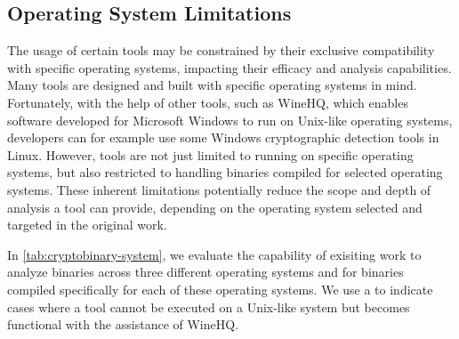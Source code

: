 

\subsection{Operating System Limitations}

The usage of certain tools may be constrained by their exclusive compatibility with specific operating systems, impacting their efficacy and analysis capabilities. Many tools are designed and built with specific operating systems in mind.  Fortunately, with the help of other tools, such as WineHQ, which enables software developed for Microsoft Windows to run on Unix-like operating systems, developers can for example use some Windows cryptographic detection tools in Linux. However, tools are not just limited to running on specific operating systems, but also restricted to handling binaries compiled for selected operating systems.
These inherent limitations potentially reduce the scope and depth of analysis a tool can provide, depending on the operating system selected and targeted in the original work.


In \autoref{tab:cryptobinary-system}, we evaluate the capability of exisiting work to analyze binaries across three different operating systems and for binaries compiled specifically for each of these operating systems. We use a \LEFTcircle \space to indicate cases where a tool cannot be executed on a Unix-like system but becomes functional with the assistance of WineHQ.

